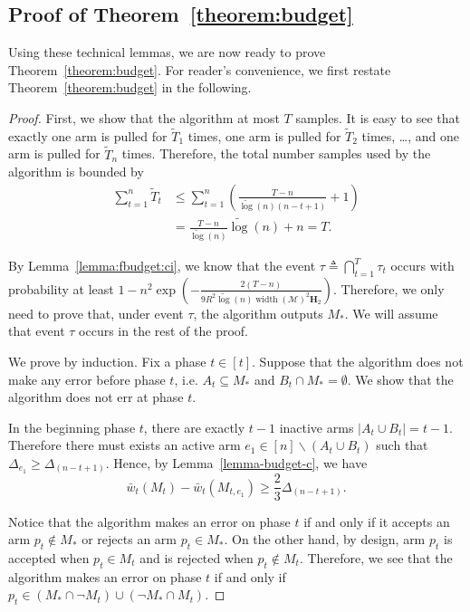 \documentclass{article}
\newcommand{\M}{\mathcal M}
\newcommand{\del}{\backslash}
\DeclareMathOperator{\rank}{width}
\newcommand{\barlog}{\tilde{\log}}
\begin{document}
\subsection{Proof of Theorem~\ref{theorem:budget}}

Using these technical lemmas, we are now ready to prove Theorem~\ref{theorem:budget}.
For reader's convenience, we first restate Theorem~\ref{theorem:budget} in the following.
\realfixbudget*

\begin{proof}
First, we show that the algorithm at most $T$ samples.
It is easy to see that exactly one arm is pulled for $\tilde T_1$ times, one arm is pulled for $\tilde T_2$ times, \ldots, and one arm is pulled for $\tilde T_n$ times. 
Therefore, the total number samples used by the algorithm is bounded by
\begin{align*}
\sum_{t=1}^n \tilde T_t 
&\le \sum_{t=1}^n \left(\frac{T-n}{\barlog(n)(n-t+1)} +1\right)\\
&= \frac{T-n}{\barlog(n)}\barlog(n)+n = T.
\end{align*}



By Lemma~\ref{lemma:fbudget:ci}, we know that the event $\tau \triangleq \bigcap_{t=1}^T \tau_t$ occurs with probability at least
$1-n^2  \exp\left(-\frac{2(T-n)}{9R^2 \barlog(n) \rank(\M)^2 \mathbf H_2} \right)$.
Therefore, we only need to prove that, under event $\tau$, the algorithm outputs $M_*$.
We will assume that event $\tau$ occurs in the rest of the proof.


We prove by induction. Fix a phase $t \in [t]$.
Suppose that the algorithm does not make any error before phase $t$, i.e. $A_t \subseteq M_*$ and $B_t \cap M_* = \emptyset$.
We show that the algorithm does not err at phase $t$.

In the beginning phase $t$, there are exactly $t-1$ inactive arms $|A_t \cup B_t| = t-1$. 
Therefore there must exists an active arm $e_1 \in [n]\del (A_t\cup B_t)$ such that 
$\Delta_{e_1} \ge \Delta_{(n-t+1)}$.
Hence, by Lemma~\ref{lemma-budget-c}, we have
\begin{equation}
\label{eq-fbdg-upper}
\bar w_t(M_t)- \bar w_t(M_{t,e_1}) \ge \frac23\Delta_{(n-t+1)}.
\end{equation}

Notice that the algorithm makes an error on phase $t$ if and only if it accepts an arm $p_t \not\in M_*$ or rejects an arm $p_t \in M_*$.
On the other hand, by design, arm $p_t$ is accepted when $p_t\in M_t$ and  is rejected when $p_t \not \in M_t$.
Therefore, we see that the algorithm makes an error on phase $t$ if and only if
$p_t \in (M_* \cap \neg M_t) \cup (\neg M_* \cap M_t)$.


\end{proof}
\end{document}
